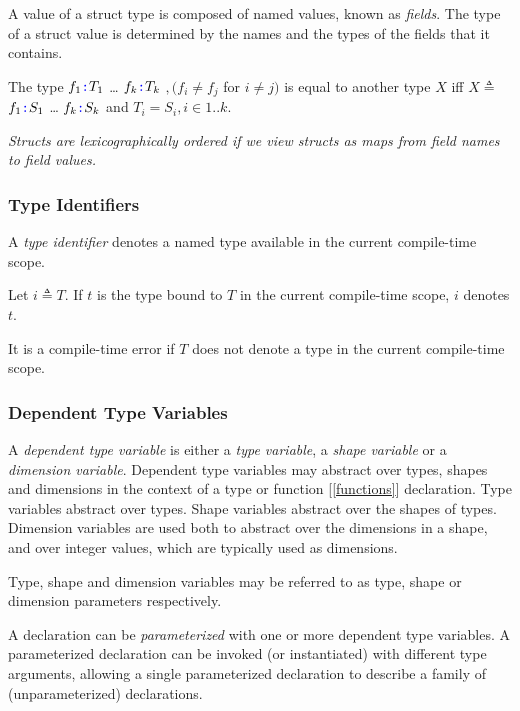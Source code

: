\documentclass{article}
\begin{document}
{A value of a struct type is composed of named values, known as {\em fields}. The type of a struct value is determined by the names and the types of the fields that it contains.

\StructType{}

\PropertySig{}

The type \LCURLY{}$f_1 \texttt{\color{blue} :}{} T_1$\COMMA{} \ldots\COMMA{}  $f_k \texttt{\color{blue} :}{} T_k$\RCURLY{} $, (f_i \ne f_j$ for $i \ne j)$ is equal to another type $X$ iff  $X \triangleq $ \LCURLY{}$f_1 \texttt{\color{blue} :}{} S_1$\COMMA{} \ldots\COMMA{}  $f_k \texttt{\color{blue} :}{} S_k$\RCURLY{} and $T_i = S_i, i \in 1..k$.


{\em
Structs are lexicographically ordered if we view structs as maps from field names to field values. 
}

\subsubsection{Type Identifiers}
\label{typeIdentifiers}

A {\em type identifier} denotes a named type available in the current compile-time scope.

Let $i \triangleq T$. If $t$ is the type bound to $T$ in the current compile-time scope, $i$ denotes $t$. 

It is a compile-time error if $T$ does not denote a type in the current compile-time scope.

\subsubsection{Dependent Type Variables}
\label{typeVariables}

A {\em dependent type variable} is either a {\em type variable}, a {\em shape variable} or a {\em dimension variable}. Dependent type variables may abstract over types, shapes and dimensions in the context of a type or function [\ref{functions}] declaration. Type variables abstract over types. Shape variables abstract over the shapes of types. Dimension variables are used both to abstract over the dimensions in a shape, and over integer values, which are typically used as dimensions.

Type, shape and dimension variables may be referred to as type, shape or dimension parameters respectively.

 A declaration can be {\em parameterized} with one or more dependent type variables. A parameterized declaration can be invoked (or instantiated) with different type arguments, allowing a single parameterized declaration to describe a family of (unparameterized) declarations. 
 
}
\end{document}
